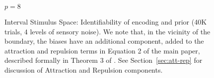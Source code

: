 \begin{figure}
\begin{minipage}[b]{0.45\linewidth}
$p=8$




\end{minipage}





\caption{
Interval Stimulus Space: Identifiability of encoding and prior (40K trials, 4 levels of sensory noise).
We note that, in the vicinity of the boundary, the biases have an additional component, added to the attraction and repulsion terms in Equation 2 of the main paper, described formally in Theorem 3 of \citet{hahn2024unifying}.
See Section~\ref{sec:att-rep} for discussion of Attraction and Repulsion components.
}\label{fig:fit-uniform-bimodal}

\end{figure}



